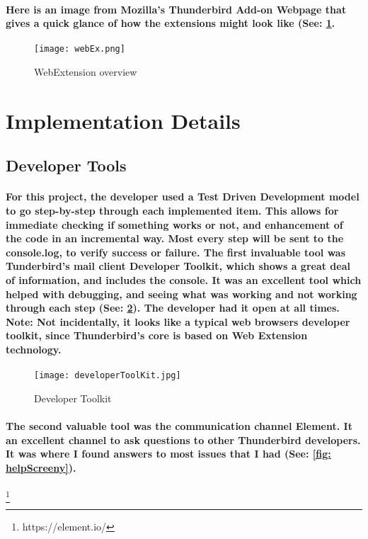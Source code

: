 \paragraph{Here is an image from Mozilla's Thunderbird Add-on Webpage that gives a quick glance of how the extensions might look like (See: \ref{fig: webEx}.} \cite[Webpage]{WebEx}

\begin{figure}[H]
\centering
\texttt{[image: webEx.png]}
\caption{\label{fig: webEx} WebExtension overview}
\end{figure}


\section{Implementation Details}

\subsection{Developer Tools}

\paragraph{For this project, the developer used a Test Driven Development model to go step-by-step through each implemented item. This allows for immediate checking if something works or not, and enhancement of the code in an incremental way. Most every step will be sent to the console.log, to verify success or failure. The first invaluable tool was Tunderbird's mail client Developer Toolkit, which shows a great deal of information, and includes the console. It was an excellent tool which helped with debugging, and seeing what was working and not working through each step (See: \ref{fig: devToolkit}). The developer had it open at all times. Note: Not incidentally, it looks like a typical web browsers developer toolkit, since Thunderbird's core is based on Web Extension technology.}


\begin{figure}[H]
\centering
\texttt{[image: developerToolKit.jpg]}
\caption{\label{fig: devToolkit} Developer Toolkit}
\end{figure}

\paragraph{The second valuable tool was the communication channel Element. It an excellent channel to ask questions to other Thunderbird developers. It was where I found answers to most issues that I had (See: \ref{fig: helpScreeny}).}\footnote{https://element.io/}

